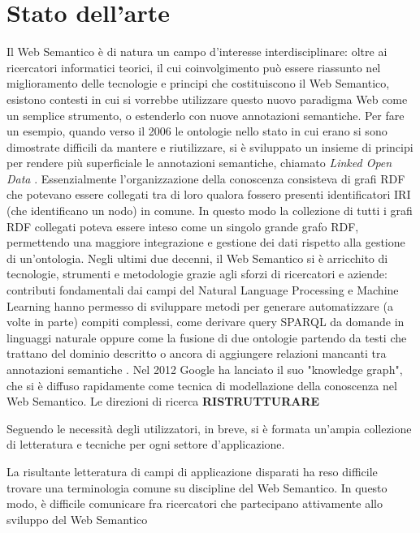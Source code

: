 \chapter[Stato dell'arte]{Stato dell'arte}
\label{chap:State-of-art}
Il Web Semantico è di natura un campo d'interesse interdisciplinare: oltre ai ricercatori informatici teorici, il cui coinvolgimento può essere riassunto nel miglioramento delle tecnologie e principi che costituiscono il Web Semantico, esistono contesti in cui si vorrebbe utilizzare questo nuovo paradigma Web come un semplice strumento, o estenderlo con nuove annotazioni semantiche. Per fare un esempio, quando verso il 2006 le ontologie nello stato in cui erano si sono dimostrate difficili da mantere e riutilizzare, si è sviluppato un insieme di principi per rendere più superficiale le annotazioni semantiche, chiamato \textit{Linked Open Data} \cite{hitzler2021review}. Essenzialmente l'organizzazione della conoscenza consisteva di grafi RDF che potevano essere collegati tra di loro qualora fossero presenti identificatori IRI (che identificano un nodo) in comune. In questo modo la collezione di tutti i grafi RDF collegati poteva essere inteso come un singolo grande grafo RDF, permettendo una maggiore integrazione e gestione dei dati rispetto alla gestione di un'ontologia. Negli ultimi due decenni, il Web Semantico si è arricchito di tecnologie, strumenti e metodologie grazie agli sforzi di ricercatori e aziende: contributi fondamentali dai campi del Natural Language Processing e Machine Learning  hanno permesso di sviluppare metodi per generare automatizzare (a volte in parte) compiti complessi, come derivare query SPARQL da domande in linguaggi naturale \cite{Evseev2020SPARQLQG, Zlatareva2021ProcessingNL, Hu2021NaturalLQ} oppure come la fusione di due ontologie partendo da testi che trattano del dominio descritto \cite{caldarolaMultiStrategyApproach} o ancora di aggiungere relazioni mancanti tra annotazioni semantiche \cite{discoveringmissingsemanticrelation, repairinghiddenlinks}. Nel 2012 Google ha lanciato il suo "knowledge graph", che si è diffuso rapidamente come tecnica di modellazione della conoscenza nel Web Semantico.
Le direzioni di ricerca 
\textbf{RISTRUTTURARE}

Seguendo le necessità degli utilizzatori, in breve, si è formata un'ampia collezione di letteratura e tecniche per ogni settore d'applicazione. 

La risultante letteratura di campi di applicazione disparati ha reso difficile trovare una terminologia comune su discipline del Web Semantico. In questo modo, è difficile comunicare fra ricercatori che partecipano attivamente allo sviluppo del Web Semantico

